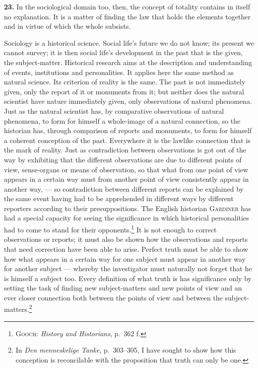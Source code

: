 \documentclass[12pt]{book}
\newcommand{\hnum}[1]{\textbf{#1.}\enspace}
\newcommand{\opage}[1]{\marginnote{\footnotesize\textit{[#1]}}}
\begin{document}
\hnum{23} In the sociological domain too, then, the concept of totality contains in
itself no explanation. It is a matter of finding the law that holds the elements
together and in virtue of which the whole subsists.

Sociology is a historical science. Social life's future we do not know; its present we
cannot survey; it is then social life's development in the past that is the given, the
subject-matter. Historical research aims at the description and understanding of events,
institutions and personalities. It applies here the same method as natural science. Its
criterion of reality is the same. The past is not immediately given, only the report of
it or monuments from it; but neither does the natural scientist have nature immediately
given, only observations of natural phenomena. Just as the natural scientist has, by
comparative observations of \opage{64}natural phenomena, to form for himself a whole-image of a
natural connection, so the historian has, through comparison of reports and monuments, to
form for himself a coherent conception of the past. Everywhere it is the lawlike
connection that is the mark of reality. Just as contradiction between observations is got
out of the way by exhibiting that the different observations are due to different points
of view, sense-organs or means of observation, so that what from one point of view appears
in a certain way must from another point of view consistently appear in another way, ---
so contradiction between different reports can be explained by the same event having had
to be apprehended in different ways by different reporters according to their
presuppositions. The English historian \textsc{Gardiner} has had a special capacity for
seeing the significance in which historical personalities had to come to stand for their
opponents.\footnote{\textsc{Gooch}: \textit{History and Historians}, p.\ 362 f.} It is not
enough to correct observations or reports; it must also be shown how the observations and
reports that need correction have been able to arise. Perfect truth must be able to show
how what appears in a certain way for one subject must appear in another way for another
subject --- whereby the investigator must naturally not forget that he is himself a
subject too. Every definition of what truth is has significance only by setting the task
of finding new subject-matters and new points of view and an ever closer connection both
between the points of view and between the subject-matters.\footnote{In \textit{Den
menneskelige Tanke}, p.\ 303--305, I have sought to show how this conception is
reconcilable with the proposition that truth can only be one.}
\end{document}
